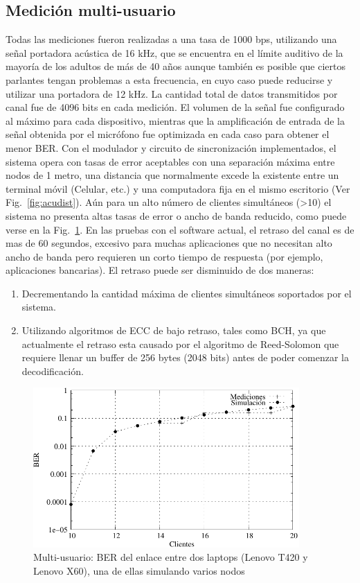 \subsection{Medición multi-usuario}

Todas las mediciones fueron realizadas a una tasa de 1000 bps, utilizando una señal portadora acústica de 16 kHz, que se encuentra en el límite auditivo de la mayoría de los adultos de más de 40 años \cite{gordon2005hearing} aunque también es posible que ciertos parlantes tengan problemas a esta frecuencia, en cuyo caso puede reducirse y utilizar una portadora de 12 kHz.
La cantidad total de datos transmitidos por canal fue de 4096 bits en cada medición. El volumen de la señal fue configurado al máximo para cada dispositivo, mientras que la amplificación de entrada de la señal obtenida por el micrófono fue optimizada en cada caso para obtener el menor BER.
Con el modulador y circuito de sincronización implementados, el sistema opera con tasas de error aceptables con una separación máxima entre nodos de 1 metro, una distancia que normalmente excede la existente entre un terminal móvil (Celular, etc.) y una computadora fija en el mismo escritorio (Ver Fig.~\ref{fig:acudist}). Aún para un alto número de clientes simultáneos (>10) el sistema no presenta altas tasas de error o ancho de banda reducido, como puede verse en la Fig.~\ref{fig:acumult}.
En las pruebas con el software actual, el retraso del canal es de mas de 60 segundos, excesivo para muchas aplicaciones que no necesitan alto ancho de banda pero requieren un corto tiempo de respuesta (por ejemplo, aplicaciones bancarias). El retraso puede ser disminuido de dos maneras: 
\begin{enumerate}
 \item Decrementando la cantidad máxima de clientes simultáneos soportados por el sistema.
 \item Utilizando algoritmos de ECC de bajo retraso, tales como BCH, ya que actualmente el retraso esta causado por el algoritmo de Reed-Solomon que requiere llenar un buffer de 256 bytes (2048 bits) antes de poder comenzar la decodificación.
\end{enumerate}

\begin{figure}[t]
  \centering
    \includegraphics[width=4in]{graphs/medidas_clientes_JIS-fig6.pdf}
\caption {Multi-usuario: BER del enlace entre dos laptops (Lenovo T420 y Lenovo X60), una de ellas simulando varios nodos}
\label{fig:acumult}
\end{figure}


